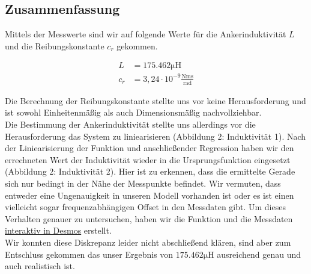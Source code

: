 \subsection{Zusammenfassung}

Mittels der Messwerte sind wir auf folgende Werte für die Ankerinduktivität $L$
und die Reibungskonstante $c_r$ gekommen.

\begin{equation} \label{eq241}
    \begin{split}
       L &=  175.462 \mathrm{\mu H}\\
       c_r &= 3,24 \cdot 10^{-9} \mathrm{\frac{Nm s}{rad}}
    \end{split}
\end{equation}

Die Berechnung der Reibungskonstante stellte uns vor keine Herausforderung
und ist sowohl Einheitenmäßig als auch Dimensionsmäßig nachvollziehbar.\\

Die Bestimmung der Ankerinduktivität stellte uns allerdings vor die
Herausforderung das System zu liniearisieren (Abbildung 2: Induktivität 1).
Nach der Liniearisierung der Funktion und anschließender Regression haben wir
den errechneten Wert der Induktivität wieder in die Ursprungsfunktion eingesetzt
(Abbildung 2: Induktivität 2). Hier ist zu erkennen, dass die ermittelte Gerade
sich nur bedingt in der Nähe der Messpunkte befindet. Wir vermuten, dass entweder
eine Ungenauigkeit in unseren Modell vorhanden ist oder es ist einen vielleicht
sogar frequenzabhängigen Offset in den Messdaten gibt. Um dieses Verhalten genauer
zu untersuchen, haben wir die Funktion und die Messdaten \href{https://www.desmos.com/calculator/2je7stqm76}{interaktiv in Desmos}
erstellt.\\

Wir konnten diese Diskrepanz leider nicht abschließend klären, sind aber zum Entschluss
gekommen das unser Ergebnis von $175.462 \mathrm{\mu H}$ ausreichend genau und auch realistisch ist.